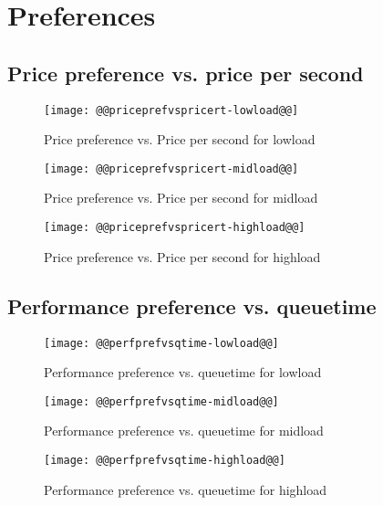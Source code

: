 \documentclass[11pt]{article}
\begin{document}
\newpage
\section{Preferences}
\subsection{Price preference vs. price per second}
\begin{figure}[htbp]
  \begin{center}
    \texttt{[image: @@priceprefvspricert-lowload@@]}
    \caption{Price preference vs. Price per second for lowload}
    \label{fig:priceprefvspricert-lowload}
  \end{center}
\end{figure}
\begin{figure}[htbp]
  \begin{center}
    \texttt{[image: @@priceprefvspricert-midload@@]}
    \caption{Price preference vs. Price per second for midload}
    \label{fig:priceprefvspricert-midload}
  \end{center}
\end{figure}
\begin{figure}[htbp]
  \begin{center}
    \texttt{[image: @@priceprefvspricert-highload@@]}
    \caption{Price preference vs. Price per second for highload}
    \label{fig:priceprefvspricert-highload}
  \end{center}
\end{figure}

\newpage
\subsection{Performance preference vs. queuetime}
\begin{figure}[htbp]
  \begin{center}
    \texttt{[image: @@perfprefvsqtime-lowload@@]}
    \caption{Performance preference vs. queuetime for lowload}
    \label{fig:perfprefvsqtime-lowload}
  \end{center}
\end{figure}
\begin{figure}[htbp]
  \begin{center}
    \texttt{[image: @@perfprefvsqtime-midload@@]}
    \caption{Performance preference vs. queuetime for midload}
    \label{fig:perfprefvsqtime-midload}
  \end{center}
\end{figure}
\begin{figure}[htbp]
  \begin{center}
    \texttt{[image: @@perfprefvsqtime-highload@@]}
    \caption{Performance preference vs. queuetime for highload}
    \label{fig:perfprefvsqtime-highload}
  \end{center}
\end{figure}
\end{document}
